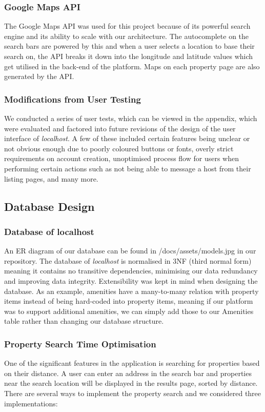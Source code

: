 \subsubsection{Google Maps API}
The Google Maps API was used for this project because of its powerful search
engine and its ability to scale with our architecture. The autocomplete on the
search bars are powered by this and when a user selects a location to base their
search on, the API breaks it down into the longitude and latitude values which
get utilised in the back-end of the platform. Maps on each property page are also
generated by the API.

\subsubsection{Modifications from User Testing}
We conducted a series of user tests, which can be viewed in the appendix, which
were evaluated and factored into future revisions of the design of the user
interface of \emph{localhost}. A few of these included certain features being
unclear or not obvious enough due to poorly coloured buttons or fonts, overly
strict requirements on account creation, unoptimised process flow for users when
performing certain actions such as not being able to message a host from their
listing pages, and many more.

\subsection{Database Design}

\subsubsection{Database of localhost}

An ER diagram of our database can be found in /docs/assets/models.jpg in our repository.
The database of \emph{localhost} is normalised in 3NF (third normal form) meaning it
contains no transitive dependencies, minimising our data redundancy and
improving data integrity. Extensibility was kept in mind when designing the
database. As an example, amenities have a many-to-many relation with property items
instead of being hard-coded into property items, meaning if our platform was to
support additional amenities, we can simply add those to our Amenities table rather
than changing our database structure.

\subsubsection{Property Search Time Optimisation}
One of the significant features in the application is searching for properties based on
their distance. A user can enter an address in the search bar and properties
near the search location will be displayed in the results page, sorted by
distance. There are several ways to implement the property search and we considered
three implementations:

